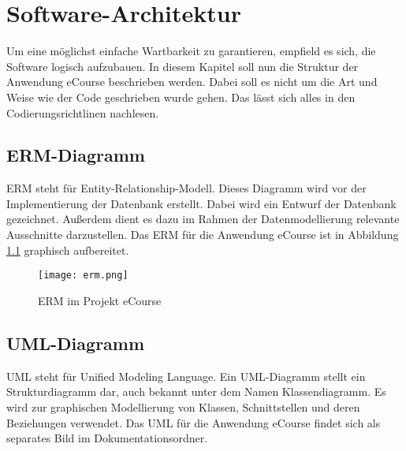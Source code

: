 \chapter{Software-Architektur}

Um eine möglichst einfache Wartbarkeit zu garantieren, empfield es sich, die Software logisch aufzubauen. In diesem Kapitel soll nun die Struktur der Anwendung eCourse beschrieben werden. Dabei soll es nicht um die Art und Weise wie der Code geschrieben wurde gehen. Das lässt sich alles in den Codierungsrichtlinen nachlesen.

\section{ERM-Diagramm}
ERM steht für Entity-Relationship-Modell. Dieses Diagramm wird vor der Implementierung der Datenbank erstellt. Dabei wird ein Entwurf der Datenbank gezeichnet. Außerdem dient es dazu im Rahmen der Datenmodellierung relevante Ausschnitte darzustellen. Das ERM für die Anwendung eCourse ist in Abbildung \ref{fib:erm} graphisch aufbereitet.

\begin{figure}[H]
\centering
\texttt{[image: erm.png]}
\caption{ERM im Projekt eCourse}
\label{fib:erm}
\end{figure}

\section{UML-Diagramm}
UML steht für Unified Modeling Language. Ein UML-Diagramm stellt ein Strukturdiagramm dar, auch bekannt unter dem Namen Klassendiagramm. Es wird zur graphischen Modellierung von Klassen, Schnittstellen und deren Beziehungen verwendet. \newline
Das UML für die Anwendung eCourse findet sich als separates Bild im Dokumentationsordner.